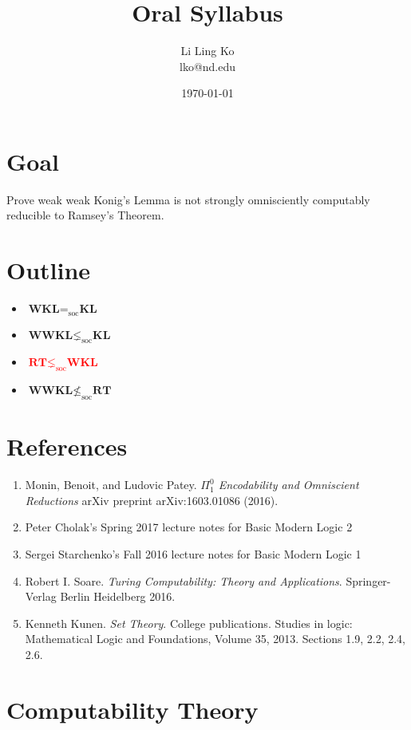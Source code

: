 \documentclass{article}
\newcommand{\MAYBE}[1]{\textcolor{red}{#1}}
\begin{document}
\title{Oral Syllabus}
\author{Li Ling Ko\\ lko@nd.edu}
\date{\today}
\maketitle

\section{Goal}
Prove weak weak Konig's Lemma is not strongly omnisciently computably
reducible to Ramsey's Theorem.

\section{Outline}
\begin{itemize}
  \item $\textbf{WKL} =_{\text{soc}} \textbf{KL}$
  \item $\textbf{WWKL} \lneq_{\text{soc}} \textbf{KL}$
  \item \MAYBE{$\textbf{RT} \lneq_{\text{soc}} \textbf{WKL}$}
  \item $\textbf{WWKL} \nleq_{\text{soc}} \textbf{RT}$
\end{itemize}

\section{References}
\begin{enumerate}
  \item Monin, Benoit, and Ludovic Patey. \textit{$\Pi_1^0$ Encodability and
    Omniscient Reductions} arXiv preprint arXiv:1603.01086 (2016).
  \item Peter Cholak's Spring 2017 lecture notes for Basic Modern Logic 2
  \item Sergei Starchenko's Fall 2016 lecture notes for Basic Modern Logic
    1
  \item Robert I. Soare. \textit{Turing Computability: Theory and
    Applications}. Springer-Verlag Berlin Heidelberg 2016.
  \item Kenneth Kunen. \textit{Set Theory}. College publications. Studies
    in logic: Mathematical Logic and Foundations, Volume 35, 2013. Sections
    1.9, 2.2, 2.4, 2.6.
\end{enumerate}

\section{Computability Theory}
\end{document}
